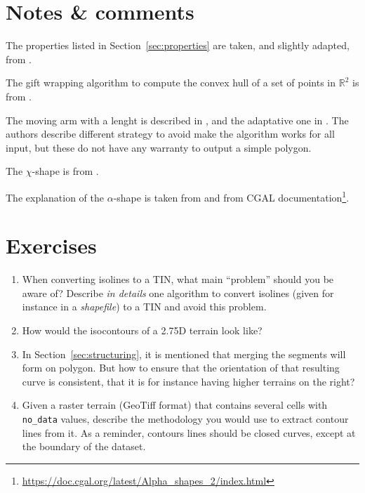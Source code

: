 %
\section{Notes \& comments}

The properties listed in Section~\ref{sec:properties} are taken, and slightly adapted, from \citet{Galton06}. 

The gift wrapping algorithm to compute the convex hull of a set of points in $\mathbb{R}^2$ is from \citet{Jarvis73}.

The moving arm with a lenght is described in \citet{Galton06}, and the adaptative one in \citet{Moreira07}.
The authors describe different strategy to avoid make the algorithm works for all input, but these do not have any warranty to output a simple polygon.

The $\chi$-shape is from \citet{Duckham08}.

The explanation of the $\alpha$-shape is taken from \citet{Edelsbrunner94} and from CGAL documentation\footnote{\url{https://doc.cgal.org/latest/Alpha_shapes_2/index.html}}.


%
\section{Exercises}

\begin{enumerate}
  \item When converting isolines to a TIN, what main ``problem'' should you be aware of? Describe \emph{in details} one algorithm to convert isolines (given for instance in a \emph{shapefile}) to a TIN and avoid this problem.
  \item How would the isocontours of a 2.75D terrain look like?
  \item In Section~\ref{sec:structuring}, it is mentioned that merging the segments will form on polygon. But how to ensure that the orientation of that resulting curve is consistent, that it is for instance having higher terrains on the right?
  \item Given a raster terrain (GeoTiff format) that contains several cells with \texttt{no\_data} values, describe the methodology you would use to extract contour lines from it. As a reminder, contours lines should be closed curves, except at the boundary of the dataset.
\end{enumerate}